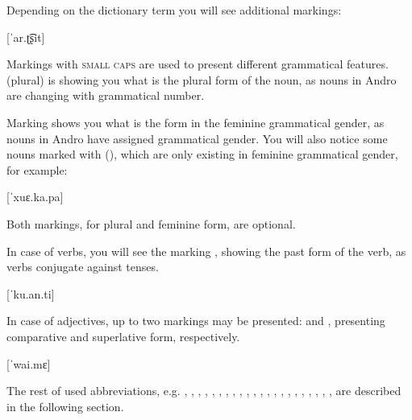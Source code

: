 \begin{spacing}{1.1}
    Depending on the dictionary term you will see additional markings:

    [ˈar.ʈ͡ʂit]
    \skipline

    Markings with \textsc{small caps} are used to present different grammatical
    features. \Pl{} (plural) is showing you what is the plural form of the
    noun, as nouns in Andro are changing with grammatical number.

    Marking \Fem{} shows you what is the form in the feminine grammatical
    gender, as nouns in Andro have assigned grammatical gender. You will also notice
    some nouns marked with (\Fem{}), which are only existing in feminine
    grammatical gender, for example:

    [ˈxuɛ.ka.pa]
    \skipline

    Both markings, for plural and feminine form, are optional.

    In case of verbs, you will see the marking \Pst{}, showing the past form
    of the verb, as verbs conjugate against tenses.

    [ˈku.an.ti]
    \skipline

    In case of adjectives, up to two markings may be presented: \Comp{} and
    \Supl{}, presenting comparative and superlative form, respectively.

    [ˈwai.mɛ]
    \skipline

    The rest of used abbreviations, e.g. \Dem{}, \Inan{}, \Rel{}, \Refl{}, \Tsg{},
    \Ssg{}, \Tpl{}, \Fpl{}, \Fsg{}, \Poss{}, \Ins{}, \Emph{}, \Imp{}, \Acc{},
    \Gen{}, \Dat{}, \Abl{}, \Loc{}, \Voc{}, \Nfrm{}, \Imp{}, \Cond{}, \Top{} are
    described in the following section.

    \skipline

    \printglosses[style=list]

\end{spacing}